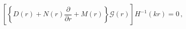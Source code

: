 \begin{equation}
\left[ \left\{ D(r)+ N(r)\frac{\partial}{\partial r} + M(r) \right\} 
{\mathcal G}(r) \right] H^{-1}(kr) = 0 \, ,
\end{equation}

